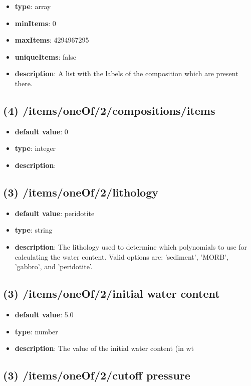 \begin{itemize}[leftmargin=3em]\item {\bf type}: array
\item {\bf minItems}: 0
\item {\bf maxItems}: 4294967295
\item {\bf uniqueItems}: false
\item {\bf description}: A list with the labels of the composition which are present there.
\end{itemize}\subsection{(4) /items/oneOf/2/compositions/items}
\begin{itemize}[leftmargin=4em]\item {\bf default value}: 0
\item {\bf type}: integer
\item {\bf description}: 
\end{itemize}\subsection{(3) /items/oneOf/2/lithology}
\begin{itemize}[leftmargin=3em]\item {\bf default value}: peridotite
\item {\bf type}: string
\item {\bf description}: The lithology used to determine which polynomials to use for calculating the water content. Valid options are: 'sediment', 'MORB', 'gabbro', and 'peridotite'.
\end{itemize}\subsection{(3) /items/oneOf/2/initial water content}
\begin{itemize}[leftmargin=3em]\item {\bf default value}: 5.0
\item {\bf type}: number
\item {\bf description}: The value of the initial water content (in wt%
\end{itemize}\subsection{(3) /items/oneOf/2/cutoff pressure}
